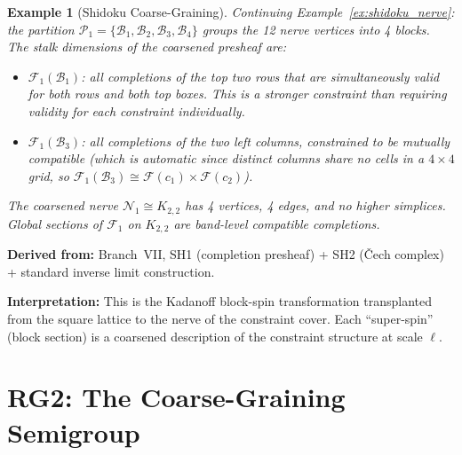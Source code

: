 \documentclass[11pt,letterpaper]{article}
\newtheorem{example}[conjecture]{Example}
\newcommand{\sheaf}{\mathcal{F}}
\newcommand{\nerve}{\mathcal{N}}
\newcommand{\block}{\mathcal{B}}
\newcommand{\partition}{\mathcal{P}}
\begin{document}
\begin{example}[Shidoku Coarse-Graining]
Continuing Example~\ref{ex:shidoku_nerve}: the partition 
$\partition_1 = \{\block_1, \block_2, \block_3, \block_4\}$ groups 
the 12 nerve vertices into 4 blocks. The stalk dimensions of the 
coarsened presheaf are:
\begin{itemize}
    \item $\sheaf_1(\block_1)$: all completions of the top two rows 
    that are simultaneously valid for both rows \emph{and} both 
    top boxes. This is a \emph{stronger} constraint than requiring 
    validity for each constraint individually.
    \item $\sheaf_1(\block_3)$: all completions of the two left 
    columns, constrained to be mutually compatible (which is 
    automatic since distinct columns share no cells in a $4 \times 4$ 
    grid, so $\sheaf_1(\block_3) \cong \sheaf(c_1) \times 
    \sheaf(c_2)$).
\end{itemize}
The coarsened nerve $\nerve_1 \cong K_{2,2}$ has 4 vertices, 4 
edges, and no higher simplices. Global sections of $\sheaf_1$ on 
$K_{2,2}$ are band-level compatible completions.
\end{example}

\textbf{Derived from:} Branch~VII, SH1 (completion presheaf) + SH2 
(\v{C}ech complex) + standard inverse limit construction.

\textbf{Interpretation:} This is the Kadanoff block-spin 
transformation transplanted from the square lattice to the nerve of 
the constraint cover. Each ``super-spin'' (block section) is a 
coarsened description of the constraint structure at scale $\ell$.

\section{RG2: The Coarse-Graining Semigroup}
\end{document}
